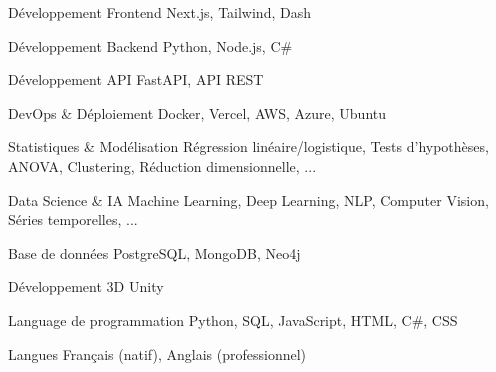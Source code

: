 


\begin{cvskills}


\cvskill
{Développement Frontend} %
{Next.js, Tailwind, Dash} %


\cvskill
{Développement Backend} %
{Python, Node.js, C\#} %


\cvskill
{Développement API} %
{FastAPI, API REST} %

\cvskill
{DevOps \& Déploiement} %
{Docker, Vercel, AWS, Azure, Ubuntu} %


\cvskill
{Statistiques \& Modélisation} %
{Régression linéaire/logistique, Tests d'hypothèses, ANOVA, Clustering, Réduction dimensionnelle, ...} %



\cvskill
{Data Science \& IA} %
{Machine Learning, Deep Learning, NLP, Computer Vision, Séries temporelles, ...} %


\cvskill
{Base de données} %
{PostgreSQL, MongoDB, Neo4j} %


\cvskill
{Développement 3D} %
{Unity} %


\cvskill
{Language de programmation} %
{Python, SQL, JavaScript, HTML, C\#, CSS} %


\cvskill
{Langues} %
{Français (natif), Anglais (professionnel)} %


\end{cvskills}